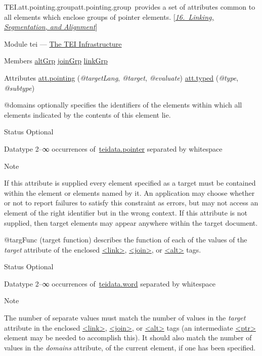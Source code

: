 \begin{reflist}
\item[]\begin{specHead}{TEI.att.pointing.group}{att.pointing.group} provides a set of attributes common to all elements which enclose groups of pointer elements. [\textit{\hyperref[SA]{16.\ Linking, Segmentation, and Alignment}}]\end{specHead} 
    \item[{Module}]
  tei — \hyperref[ST]{The TEI Infrastructure}
    \item[{Members}]
  \hyperref[TEI.altGrp]{altGrp} \hyperref[TEI.joinGrp]{joinGrp} \hyperref[TEI.linkGrp]{linkGrp}
    \item[{Attributes}]
  \hyperref[TEI.att.pointing]{att.pointing} (\textit{@targetLang}, \textit{@target}, \textit{@evaluate}) \hyperref[TEI.att.typed]{att.typed} (\textit{@type}, \textit{@subtype}) \hfil\\[-10pt]\begin{sansreflist}
    \item[@domains]
  optionally specifies the identifiers of the elements within which all elements indicated by the contents of this element lie.
\begin{reflist}
    \item[{Status}]
  Optional
    \item[{Datatype}]
  2–∞ occurrences of \hyperref[TEI.teidata.pointer]{teidata.pointer} separated by whitespace
    \item[{Note}]
  \par
If this attribute is supplied every element specified as a target must be contained within the element or elements named by it. An application may choose whether or not to report failures to satisfy this constraint as errors, but may not access an element of the right identifier but in the wrong context. If this attribute is not supplied, then target elements may appear anywhere within the target document.
\end{reflist}  
    \item[@targFunc]
  (target function) describes the function of each of the values of the {\itshape target} attribute of the enclosed \hyperref[TEI.link]{<link>}, \hyperref[TEI.join]{<join>}, or \hyperref[TEI.alt]{<alt>} tags.
\begin{reflist}
    \item[{Status}]
  Optional
    \item[{Datatype}]
  2–∞ occurrences of \hyperref[TEI.teidata.word]{teidata.word} separated by whitespace
    \item[{Note}]
  \par
The number of separate values must match the number of values in the {\itshape target} attribute in the enclosed \hyperref[TEI.link]{<link>}, \hyperref[TEI.join]{<join>}, or \hyperref[TEI.alt]{<alt>} tags (an intermediate \hyperref[TEI.ptr]{<ptr>} element may be needed to accomplish this). It should also match the number of values in the {\itshape domains} attribute, of the current element, if one has been specified.
\end{reflist}  
\end{sansreflist}  
\end{reflist}  
